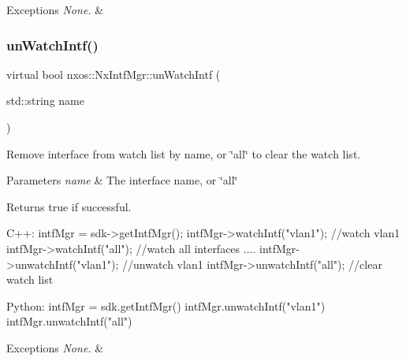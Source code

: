 \begin{DoxyExceptions}{Exceptions}
{\em None.} & \\
\hline
\end{DoxyExceptions}
\mbox{\label{classnxos_1_1_nx_intf_mgr_a325eed4d08efc01fca1993148911a21a}} 
\subsubsection{\texorpdfstring{un\+Watch\+Intf()}{unWatchIntf()}}
{\footnotesize\ttfamily virtual bool nxos\+::\+Nx\+Intf\+Mgr\+::un\+Watch\+Intf (\begin{DoxyParamCaption}\item[{std\+::string}]{name }\end{DoxyParamCaption})\hspace{0.3cm}{\ttfamily [pure virtual]}}

Remove interface from watch list by name, or \char`\"{}all\char`\"{} to clear the watch list.


\begin{DoxyParams}{Parameters}
{\em name} & The interface name, or \char`\"{}all\char`\"{} \\
\hline
\end{DoxyParams}
\begin{DoxyReturn}{Returns}
true if successful.
\end{DoxyReturn}

\begin{DoxyCode}
C++:
      intfMgr = sdk->getIntfMgr();
      intfMgr->watchIntf(\textcolor{stringliteral}{"vlan1"});  \textcolor{comment}{//watch vlan1}
      intfMgr->watchIntf(\textcolor{stringliteral}{"all"});   \textcolor{comment}{//watch all interfaces}
      ....
      intfMgr->unwatchIntf(\textcolor{stringliteral}{"vlan1"});  \textcolor{comment}{//unwatch vlan1}
      intfMgr->unwatchIntf(\textcolor{stringliteral}{"all"});   \textcolor{comment}{//clear watch list}

Python:
      intfMgr = sdk.getIntfMgr()
      intfMgr.unwatchIntf(\textcolor{stringliteral}{"vlan1"}) 
      intfMgr.unwatchIntf(\textcolor{stringliteral}{"all"})
\end{DoxyCode}



\begin{DoxyExceptions}{Exceptions}
{\em None.} & \\
\hline
\end{DoxyExceptions}
\mbox{\label{classnxos_1_1_nx_intf_mgr_aa07fd4d582d52a9aac7a2efd88675bfc}} 
